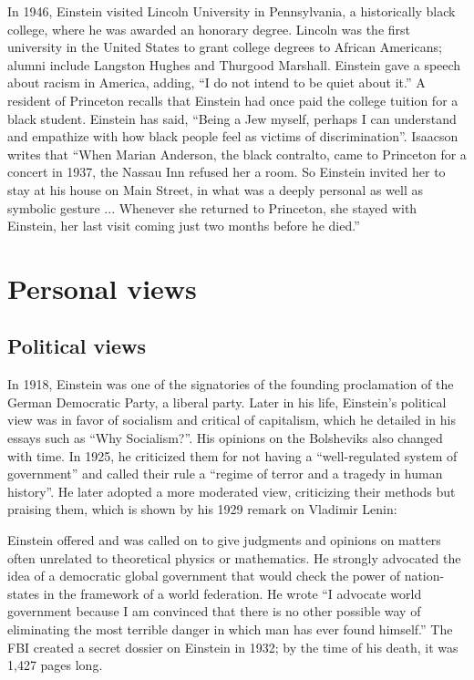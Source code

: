 \documentclass[twoside]{memoir}
\begin{document}
In 1946, Einstein visited Lincoln University  in  Pennsylvania, a historically black college, where he was awarded an honorary degree. Lincoln was the first university in the United States to grant college degrees to African Americans; alumni include Langston Hughes and Thurgood Marshall. Einstein gave a speech about racism in America, adding, \enquote{I do not intend to be quiet about it.} A resident of Princeton recalls that Einstein had once paid the college tuition for a black student.\cite{civil} Einstein has said, \enquote{Being a Jew myself, perhaps I can understand and empathize with how black people feel as victims of discrimination}. Isaacson writes that \enquote{When Marian Anderson,  the black contralto, came to Princeton for a concert in 1937, the Nassau Inn refused her a room. So Einstein invited her to stay at his house on Main Street, in what was a deeply personal as well as symbolic gesture ... Whenever she returned to Princeton, she stayed with Einstein, her last visit coming just two months before he died.}

\chapter{Personal views}\label{personal-views}

\section{Political views}\label{political-views}

In 1918,  Einstein was one of the signatories of the founding proclamation of the German Democratic Party, a liberal party. Later in his life, Einstein's political view was in favor of socialism and critical of capitalism, which he detailed in his essays such as \enquote{Why Socialism?}. His opinions on the Bolsheviks also changed with time. In 1925, he criticized them for not having a \enquote{well-regulated system of government} and called their rule a \enquote{regime of terror and a tragedy in human history}. He later adopted a more moderated view, criticizing their methods but praising them, which is shown by his 1929 remark on Vladimir Lenin:

Einstein offered and was called on to give judgments and opinions on matters often unrelated to theoretical physics or mathematics. He strongly advocated the idea of a democratic global government that would check the power of nation-states in the framework of a world federation. He wrote \enquote{I advocate world government because I am convinced that there is no other possible way of eliminating the most terrible danger in which man has ever found himself.} The \acrshort{FBI} created a secret dossier on Einstein in 1932; by the time of his death, it was 1,427 pages long.
\end{document}
